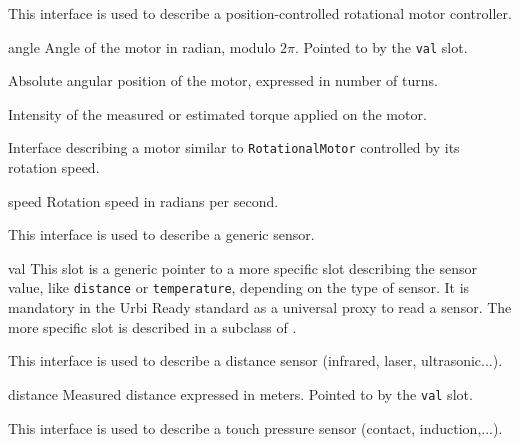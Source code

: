 

This interface is used to describe a position-controlled rotational motor
controller.

\begin{urbiscriptapi}
\item[angle] Angle of the motor in radian, modulo $2\pi$. Pointed to by the
  \lstinline{val} slot.

\item[turn] Absolute angular position of the motor, expressed in number of
  turns.

\item[torque] Intensity of the measured or estimated torque applied on the
  motor.
\end{urbiscriptapi}


Interface describing a motor similar to \lstinline{RotationalMotor}
controlled by its rotation speed.

\begin{urbiscriptapi}
\item[speed] Rotation speed in radians per second.
\end{urbiscriptapi}


This interface is used to describe a generic sensor.

\begin{urbiscriptapi}
\item[val] This slot is a generic pointer to a more specific slot describing
  the sensor value, like \lstinline{distance} or \lstinline{temperature},
  depending on the type of sensor. It is mandatory in the Urbi Ready
  standard as a universal proxy to read a sensor. The more specific slot is
  described in a subclass of .
\end{urbiscriptapi}



This interface is used to describe a distance sensor (infrared, laser,
ultrasonic...).

\begin{urbiscriptapi}
\item[distance] Measured distance expressed in meters.  Pointed to by the
  \lstinline{val} slot.
\end{urbiscriptapi}



This interface is used to describe a touch pressure sensor (contact,
induction,...).

